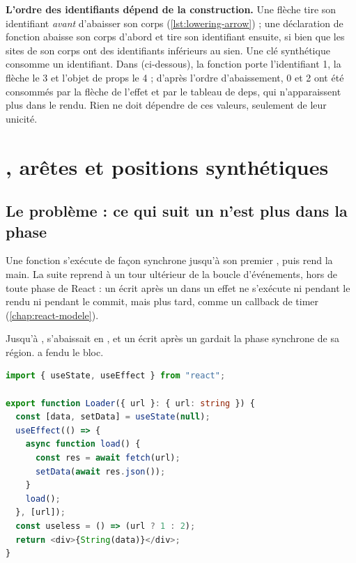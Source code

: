 \begin{piege}
\textbf{L'ordre des identifiants dépend de la construction.} Une flèche tire son identifiant \emph{avant} d'abaisser son corps (\cref{lst:lowering-arrow}) ; une déclaration de fonction abaisse son corps d'abord et tire son identifiant ensuite, si bien que les sites de son corps ont des identifiants inférieurs au sien. Une clé synthétique consomme un identifiant. Dans  (ci-dessous), la fonction  porte l'identifiant 1, la flèche  le 3 et l'objet de props le 4 ; d'après l'ordre d'abaissement, 0 et 2 ont été consommés par la flèche de l'effet et par le tableau de deps, qui n'apparaissent plus dans le rendu. Rien ne doit dépendre de ces valeurs, seulement de leur unicité.
\end{piege}

\section{, arêtes  et positions synthétiques}
\label{sec:lowering-await}

\subsection{Le problème : ce qui suit un  n'est plus dans la phase}

\begin{react}
Une fonction  s'exécute de façon synchrone jusqu'à son premier , puis rend la main. La suite reprend à un tour ultérieur de la boucle d'événements, hors de toute phase de React : un  écrit après un  dans un effet ne s'exécute ni pendant le rendu ni pendant le commit, mais plus tard, comme un callback de timer (\cref{chap:react-modele}).
\end{react}

Jusqu'à ,  s'abaissait en , et un  écrit après un  gardait la phase synchrone de sa région.  a fendu le bloc.

\begin{lstlisting}[language=TypeScript,caption={Un effet asynchrone (\file{/tmp/ch07/e6_async.tsx})},label={lst:lowering-loader}]
import { useState, useEffect } from "react";

export function Loader({ url }: { url: string }) {
  const [data, setData] = useState(null);
  useEffect(() => {
    async function load() {
      const res = await fetch(url);
      setData(await res.json());
    }
    load();
  }, [url]);
  const useless = () => (url ? 1 : 2);
  return <div>{String(data)}</div>;
}
\end{lstlisting}

